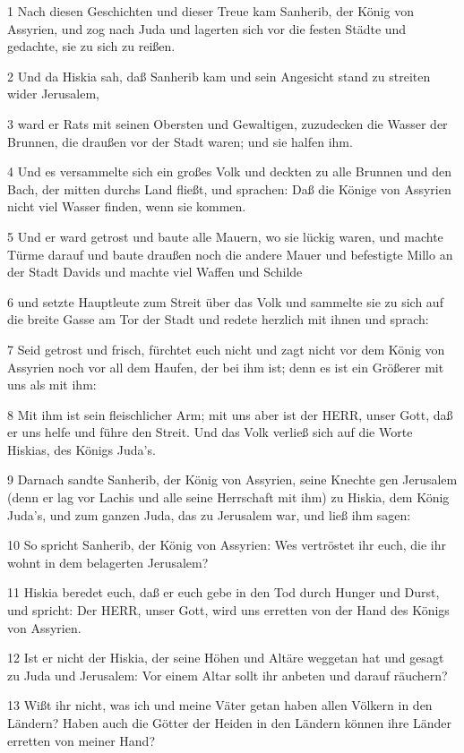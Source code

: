 \par 1 Nach diesen Geschichten und dieser Treue kam Sanherib, der König von Assyrien, und zog nach Juda und lagerten sich vor die festen Städte und gedachte, sie zu sich zu reißen.
\par 2 Und da Hiskia sah, daß Sanherib kam und sein Angesicht stand zu streiten wider Jerusalem,
\par 3 ward er Rats mit seinen Obersten und Gewaltigen, zuzudecken die Wasser der Brunnen, die draußen vor der Stadt waren; und sie halfen ihm.
\par 4 Und es versammelte sich ein großes Volk und deckten zu alle Brunnen und den Bach, der mitten durchs Land fließt, und sprachen: Daß die Könige von Assyrien nicht viel Wasser finden, wenn sie kommen.
\par 5 Und er ward getrost und baute alle Mauern, wo sie lückig waren, und machte Türme darauf und baute draußen noch die andere Mauer und befestigte Millo an der Stadt Davids und machte viel Waffen und Schilde
\par 6 und setzte Hauptleute zum Streit über das Volk und sammelte sie zu sich auf die breite Gasse am Tor der Stadt und redete herzlich mit ihnen und sprach:
\par 7 Seid getrost und frisch, fürchtet euch nicht und zagt nicht vor dem König von Assyrien noch vor all dem Haufen, der bei ihm ist; denn es ist ein Größerer mit uns als mit ihm:
\par 8 Mit ihm ist sein fleischlicher Arm; mit uns aber ist der HERR, unser Gott, daß er uns helfe und führe den Streit. Und das Volk verließ sich auf die Worte Hiskias, des Königs Juda's.
\par 9 Darnach sandte Sanherib, der König von Assyrien, seine Knechte gen Jerusalem (denn er lag vor Lachis und alle seine Herrschaft mit ihm) zu Hiskia, dem König Juda's, und zum ganzen Juda, das zu Jerusalem war, und ließ ihm sagen:
\par 10 So spricht Sanherib, der König von Assyrien: Wes vertröstet ihr euch, die ihr wohnt in dem belagerten Jerusalem?
\par 11 Hiskia beredet euch, daß er euch gebe in den Tod durch Hunger und Durst, und spricht: Der HERR, unser Gott, wird uns erretten von der Hand des Königs von Assyrien.
\par 12 Ist er nicht der Hiskia, der seine Höhen und Altäre weggetan hat und gesagt zu Juda und Jerusalem: Vor einem Altar sollt ihr anbeten und darauf räuchern?
\par 13 Wißt ihr nicht, was ich und meine Väter getan haben allen Völkern in den Ländern? Haben auch die Götter der Heiden in den Ländern können ihre Länder erretten von meiner Hand?
